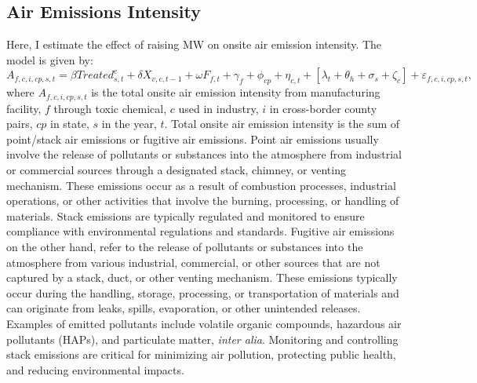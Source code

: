\documentclass[12pt, english]{article}
\begin{document}
    \subsection{Air Emissions Intensity}\label{subsec:air-emission-intensity}
    Here, I estimate the effect of raising MW on onsite air emission intensity. The model is given by:
    \begin{equation}
        A_{f,c,i,cp,s,t} = \beta Treated_{s,t}^e + \delta X_{v,c,t-1} + \omega F_{f,t} + \gamma_{f} + \phi_{cp} + \eta_{c,t} + \left[\lambda_{t} + \theta_{h} + \sigma_{s} + \zeta_{c} \right] + \varepsilon_{f,c,i,cp,s,t},\label{eq:baseline-onsite-air-emission-intensity}
    \end{equation}
    where $A_{f,c,i,cp,s,t}$ is the total onsite air emission intensity from manufacturing facility, $f$ through toxic chemical, $c$ used in industry, $i$ in cross-border county pairs, $cp$ in state, $s$ in the year, $t$. Total onsite air emission intensity is the sum of point/stack air emissions or fugitive air emissions. Point air emissions usually involve the release of pollutants or substances into the atmosphere from industrial or commercial sources through a designated stack, chimney, or venting mechanism. These emissions occur as a result of combustion processes, industrial operations, or other activities that involve the burning, processing, or handling of materials. Stack emissions are typically regulated and monitored to ensure compliance with environmental regulations and standards. Fugitive air emissions on the other hand, refer to the release of pollutants or substances into the atmosphere from various industrial, commercial, or other sources that are not captured by a stack, duct, or other venting mechanism. These emissions typically occur during the handling, storage, processing, or transportation of materials and can originate from leaks, spills, evaporation, or other unintended releases. Examples of emitted pollutants include volatile organic compounds, hazardous air pollutants (HAPs), and particulate matter, \textit{inter alia}. Monitoring and controlling stack emissions are critical for minimizing air pollution, protecting public health, and reducing environmental impacts.
    
\end{document}
